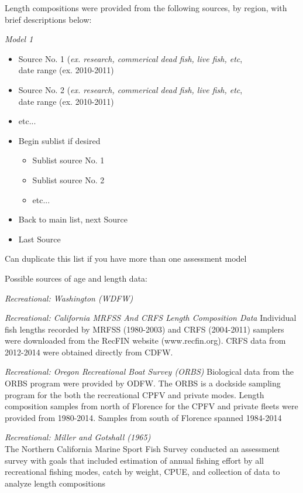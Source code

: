 \documentclass[12pt,]{article}
\begin{document}
Length compositions were provided from the following sources, by region,
with brief descriptions below:

\emph{Model 1}

\begin{itemize}[noitemsep,nolistsep,topsep=0pt]
  \item Source No. 1 (\emph{ex. research, commerical dead fish, live fish, etc},\\     
        date range (ex. 2010-2011)
  \item Source No. 2 (\emph{ex. research, commerical dead fish, live fish, etc},\\      
        date range (ex. 2010-2011) 
  \item etc...      
  \item Begin sublist if desired 
    \begin{itemize}[noitemsep,nolistsep]
      \item Sublist source No. 1     
      \item Sublist source No. 2        
      \item etc...     
    \end{itemize}
  \item Back to main list, next Source     
  \item Last Source     
\end{itemize}

Can duplicate this list if you have more than one assessment model

Possible sources of age and length data:

\emph{Recreational: Washington (WDFW)}

\emph{Recreational: California MRFSS And CRFS Length Composition Data}
Individual fish lengths recorded by MRFSS (1980-2003) and CRFS
(2004-2011) samplers were downloaded from the RecFIN website
(www.recfin.org). CRFS data from 2012-2014 were obtained directly from
CDFW.

\emph{Recreational: Oregon Recreational Boat Survey (ORBS)} Biological
data from the ORBS program were provided by ODFW. The ORBS is a dockside
sampling program for the both the recreational CPFV and private modes.
Length composition samples from north of Florence for the CPFV and
private fleets were provided from 1980-2014. Samples from south of
Florence spanned 1984-2014

\emph{Recreational: Miller and Gotshall (1965)}\\
The Northern California Marine Sport Fish Survey conducted an assessment
survey with goals that included estimation of annual fishing effort by
all recreational fishing modes, catch by weight, CPUE, and collection of
data to analyze length compositions
\end{document}

